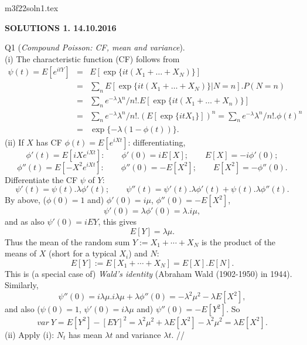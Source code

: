 \documentclass[12pt]{article}
\begin{document}
\def\R{\mathbb{R}}
\def\Z{\mathbb{Z}}
\def\N{\mathbb{N}}
\def\Q{\mathbb{Q}}
\def\T{\mathbb{T}}
\def\hb{\hfil \break}
\def\ni{\noindent}
\def\i{\indent}
\def\a{\alpha}
\def\b{\beta}
\def\e{\epsilon}
\def\d{\delta}
\def\D{\Delta}
\def\g{\gamma}
\def\qq{\qquad}
\def\L{\Lambda}
\def\E{\cal E}
\def\G{\Gamma}
\def\F{\cal F}
\def\K{\cal K}
\def\A{\cal A}
\def\B{\cal B}
\def\C{\cal C}
\def\M{\cal M}
\def\P{\cal P}
\def\Om{\Omega}
\def\om{\omega}
\def\s{\sigma}
\def\t{\theta}
\def\th{\theta}
\def\Th{\Theta}
\def\z{\zeta}
\def\p{\phi}
\def\m{\mu}
\def\n{\nu}
\def\l{\lambda}
\def\Si{\Sigma}
\def\q{\quad}
\def\qq{\qquad}
\def\half{\frac{1}{2}}
\def\hb{\hfil \break}
\def\half{\frac{1}{2}}
\def\pa{\partial}
\def\r{\rho}
\def\hb{\hfil \break}
\def\ni{\noindent}
\def\i{\indent}
\def\ti{\tilde}
\ni m3f22soln1.tex \\
\begin{center}
{\bf SOLUTIONS 1.  14.10.2016}
\end{center}

\ni Q1 ({\it Compound Poisson: CF, mean and variance}). \\
(i) The characteristic function (CF) follows from 
\begin{eqnarray*}
\psi(t) = E[e^{itY}]
&=& E[\exp \{it (X_1 + \ldots + X_N) \}] \\
&=& \sum_n E[\exp \{it(X_1 + \ldots + X_N) \}|N = n].P(N = n) \\
&=& \sum_n e^{-\l} {\l}^n/n!.E[\exp \{it(X_1 + \ldots + X_n) \}] \\
&=& \sum_n e^{-\l} {\l}^n/n!.(E[\exp \{it X_1 \}])^n 
= \sum_n e^{-\l} {\l}^n/n!.\phi(t)^n \\
&=& \exp \{-\l (1 - \phi(t)) \}.
\end{eqnarray*}
(ii) If $X$ has CF $\phi(t) = E[e^{iXt}]$: differentiating,
$$
{\phi}'(t) = E[i X e^{iXt}]: \qquad {\phi}'(0) = i E[X]; \qquad E[X] = - i {\phi}'(0);
$$
$$
{\phi}''(t) = E[- X^2 e^{iXt}]: \qquad {\phi}''(0) = - E[X^2]; \qquad E[X^2] = - {\phi}''(0).
$$  
Differentiate the CF $\psi$ of $Y$:
$$
{\psi}'(t) = \psi(t).\l {\phi}'(t);
\qquad
{\psi}''(t) = {\psi}'(t).\l {\phi}'(t) + \psi(t).\l {\phi}''(t).
$$
By above, ($\phi(0)
= 1$ and) ${\phi}'(0) = i \m$, ${\phi}''(0) = -E[X^2]$,
$$
{\psi}'(0) = \l {\phi}'(0) = \l.i \m,
$$
and as also ${\psi}'(0) = i EY$, this gives
$$
E[Y] = \l \m.
$$
Thus the mean of the random sum $Y := X_1 + \cdots + X_N$ is the product of the means of $X$ (short for a typical $X_i$) and $N$:
$$
E[Y] := E[X_1 + \cdots + X_N] = E[X].E[N].
$$
This is (a special case of) {\it Wald's identity} (Abraham Wald (1902-1950) in 1944).  Similarly,
$$
{\psi}''(0) = i \l \m.i \l \m + \l {\phi}''(0) = - {\l}^2 {\m}^2 -
\l E[X^2],
$$
and also ($\psi(0) = 1$, ${\psi}'(0) = i \lambda \mu$ and)
${\psi}''(0) = -E[Y^2]$. So
$$
var \ Y = E[Y^2] - [EY]^2 = {\l}^2 {\m}^2 + \l E[X^2] - {\l}^2 {\m}^2 = \l E[X^2].
$$
(ii) Apply (i): $N_t$ has mean $\l t$ and variance $\lambda t$. // \\
\end{document}
